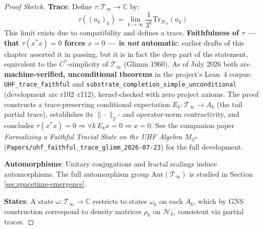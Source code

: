 \begin{level3}
\begin{proof}[Proof Sketch]
\textbf{Trace}: Define $\tau: \mathcal{T}_\infty \to \mathbb{C}$ by:
\begin{equation}
\tau((a_k)_k) = \lim_{k \to \infty} \frac{1}{3^k}\text{Tr}_{\mathcal{H}_k}(a_k)
\end{equation}
This limit exists due to compatibility and defines a trace. \textbf{Faithfulness of $\tau$ --- that $\tau(x^*x) = 0$ forces $x = 0$ --- is \emph{not} automatic}: earlier drafts of this chapter asserted it in passing, but it is in fact the deep part of the statement, equivalent to the $C^*$-simplicity of $\mathcal{T}_\infty$ (Glimm 1960). As of July 2026 both are \textbf{machine-verified, unconditional theorems} in the project's Lean~4 corpus: \texttt{UHF\_trace\_faithful} and \texttt{substrate\_completion\_simple\_unconditional} (development arc r102--r112), kernel-checked with zero project axioms. The proof constructs a trace-preserving conditional expectation $E_k: \mathcal{T}_\infty \to A_k$ (the tail partial trace), establishes its $\|\cdot\|_2$- and operator-norm contractivity, and concludes $\tau(x^*x)=0 \Rightarrow \forall k\, E_k x = 0 \Rightarrow x=0$. See the companion paper \emph{Formalizing a Faithful Tracial State on the UHF Algebra $M_{3^\infty}$} (\texttt{Papers/uhf\_faithful\_trace\_glimm\_2026-07-23}) for the full development.

\textbf{Automorphisms}: Unitary conjugations and fractal scalings induce automorphisms. The full automorphism group $\text{Aut}(\mathcal{T}_\infty)$ is studied in Section \ref{sec:spacetime-emergence}.

\textbf{States}: A state $\omega: \mathcal{T}_\infty \to \mathbb{C}$ restricts to states $\omega_k$ on each $A_k$, which by GNS construction correspond to density matrices $\rho_k$ on $\mathcal{H}_k$, consistent via partial traces.
\end{proof}


\end{level3}
